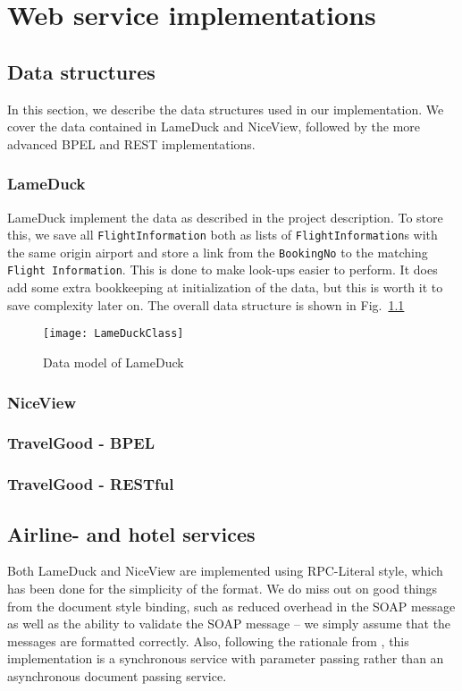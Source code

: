 {\setlength{\chapterfontsize}{23pt}
\chapter{Web service implementations}
}

\section{Data structures}
In this section, we describe the data structures used in our implementation. We cover the data contained in LameDuck and NiceView, followed by the more advanced BPEL and REST implementations.

\subsection{LameDuck}
LameDuck implement the data as described in the project description. To store this, we save all \texttt{FlightInformation} both as lists of \texttt{FlightInformation}s with the same origin airport and store a link from the \texttt{BookingNo} to the matching \texttt{Flight Information}. This is done to make look-ups easier to perform. It does add some extra bookkeeping at initialization of the data, but this is worth it to save complexity later on. The overall data structure is shown in Fig.~\ref{fig:lameduck_class}

\begin{figure}[H]
\centering
\texttt{[image: LameDuckClass]}
\caption{Data model of LameDuck}
\label{fig:lameduck_class}
\end{figure}


\subsection{NiceView}


\subsection{TravelGood - BPEL}

\subsection{TravelGood - RESTful}
\section{Airline- and hotel services}
Both LameDuck and NiceView are implemented using RPC-Literal style, which has been done for the simplicity of the format. We do miss out on good things from the document style binding, such as reduced overhead in the SOAP message as well as the ability to validate the SOAP message -- we simply assume that the messages are formatted correctly. 
Also, following the rationale from \cite{papazoglou2008web}, this implementation is a synchronous service with parameter passing rather than an asynchronous document passing service.

